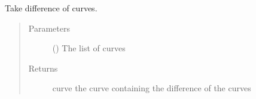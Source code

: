 \documentclass[letterpaper,10pt,english]{sphinxmanual}
\begin{document}

\begin{fulllineitems}
\label{\detokenize{pydv:pydvpy.subtract}}
Take difference of curves.

\begin{sphinxVerbatim}[commandchars=\\\{\}]
  
\end{sphinxVerbatim}

\begin{sphinxVerbatim}[commandchars=\\\{\}]
  
\end{sphinxVerbatim}
\begin{quote}\begin{description}
\item[{Parameters}] \leavevmode
{} () \textendash{} The list of curves

\item[{Returns}] \leavevmode
curve \textendash{} the curve containing the difference of the curves

\end{description}\end{quote}

\end{fulllineitems}

\end{document}
